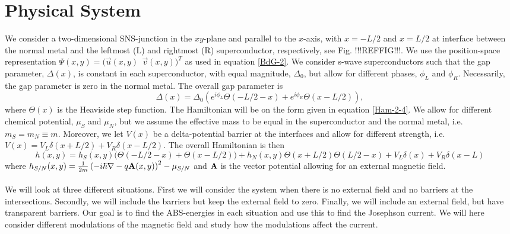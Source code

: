 \chapter{Physical System}
We consider a two-dimensional SNS-junction in the $xy$-plane and parallel to the $x$-axis, with $x=-L/2$ and $x=L/2$ at interface between the normal metal and the leftmost (L) and rightmost (R) superconductor, respectively, see Fig. !!!REFFIG!!!. We use the position-space representation $\Psi(x,y) = \big(\vec{u}(x,y) \ \ \vec{v}(x,y) \big)^T$ as used in equation \eqref{BdG-2}. We consider s-wave superconductors such that the gap parameter, $\Delta(x)$, is constant in each superconductor, with equal magnitude, $\Delta_0$, but allow for different phases, $\phi_L$ and $\phi_R$. Necessarily, the gap parameter is zero in the normal metal. The overall gap parameter is
\begin{equation}
    \Delta(x) = \Delta_0\left( e^{i\phi_L}\Theta(-L/2-x) + e^{i\phi_R}\Theta(x-L/2)\right),
\end{equation}
where $\Theta(x)$ is the Heaviside step function. 
The Hamiltonian will be on the form given in equation \eqref{Ham-2-4}. We allow for different chemical potential, $\mu_S$ and $\mu_N$, but we assume the effective mass to be equal in the superconductor and the normal metal, i.e. $m_S = m_N \equiv m$. Moreover, we let $V(x)$ be a delta-potential barrier at the interfaces and allow for different strength, i.e. $V(x) = V_L\delta(x+L/2) + V_R\delta(x-L/2)$. The overall Hamiltonian is then
\begin{equation}
    h(x,y) = h_S(x,y)\big(\Theta(-L/2-x) + \Theta(x-L/2) \big) + h_N(x,y)\Theta(x+L/2)\Theta(L/2-x) + V_L\delta(x) + V_R\delta(x-L)
\label{Ham-3}
\end{equation}
where $h_{S/N}(x,y) = \frac{1}{2m}\left(-i\hbar\nabla-q\mathbf{A}(x,y)\right)^2-\mu_{S/N}$ and $\mathbf{A}$ is the vector potential allowing for an external magnetic field.
\\
\\
We will look at three different situations. First we will consider the system when there is no external field and no barriers at the intersections. Secondly, we will include the barriers but keep the external field to zero. Finally, we will include an external field, but have transparent barriers. Our goal is to find the ABS-energies in each situation and use this to find the Josephson current. We will here consider different modulations of the magnetic field and study how the modulations affect the current. 

